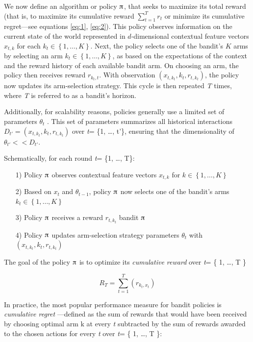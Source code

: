 \documentclass{jss}
\begin{document}
We now define an algorithm or policy $\piup$, that seeks to maximize its total reward (that is, to maximize its cumulative reward $\sum_{t=1}^T r_t$ or minimize its cumulative regret---see equations \ref{eq:1}, \ref{eq:2}). This policy observes information on the current state of the world represented in $d$-dimensional contextual feature vectors \(x_{t,k}\) for each \(k_{t} \in \left\{ 1, \dots,K \right\}\). Next, the policy selects one of the bandit's $K$ arms by selecting an arm \(k_{t} \in \left\{ 1, \dots,K \right\}\), as based on the expectations of the context and the reward history of each available bandit arm. On choosing an arm, the policy then receives reward \(r_{k_{t},t}\). With observation \( (x_{t,k_t},k_{t},r_{t,k_t}) \), the policy now updates its arm-selection strategy. This cycle is then repeated \textit{T} times, where \textit{T} is referred to as a bandit's horizon.

Additionally, for scalability reasons, policies generally use a limited set of parameters $\theta_{t}$ \citep{kruijswijk2018streamingbandit}. This set of parameters summarizes all historical interactions \( D_{t'} = (x_{t,k_t},k_{t},r_{t,k_t}) \) over \emph{t}= \{1, \ldots, t'\}, ensuring that the dimensionality of $\theta_{t'} << D_{t'}$.

Schematically, for each round \emph{t}= \{1, \ldots, T\}:

\begin{enumerate}
         \item[1)] Policy $\piup$ observes contextual feature vectors $x_{t,k}$ for \(k \in \left\{ 1, \dots,K \right\}\)
         \item[2)] Based on $x_{t}$ and $\theta_{t-1}$, policy $\piup$ now selects one of the bandit's arms \(k_{t} \in \left\{ 1, \dots,K \right\}\)
         \item[3)] Policy $\piup$ receives a reward \(r_{t,k_t}\) bandit $\piup$
         \item[4)] Policy $\piup$ updates arm-selection strategy parameters $\theta_{t}$ with \( (x_{t,k_t},k_{t},r_{t,k_t}) \)
\end{enumerate}

The goal of the policy $\piup$ is to optimize its \textit{cumulative reward} over \emph{t}= \{ 1, \ldots, T \}

\begin{equation} \label{eq:1}
R_{T} = \sum^{T}_{t=1}(r_{k_t,x_t})
\end{equation}

In practice, the most popular performance measure for bandit policies is \textit{cumulative regret} \citep{Kuleshov2014}---defined as the sum of rewards that would have been received by choosing optimal arm $\mathrm{k}$ at every \emph{t} subtracted by the sum of rewards awarded to the chosen actions for every \emph{t} over \emph{t}= \{ 1, \ldots, T \}:
\end{document}
